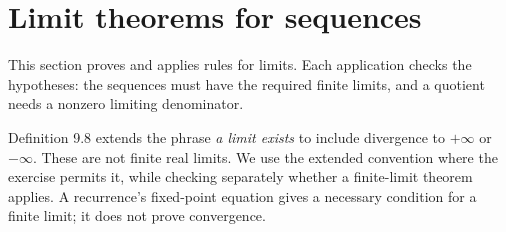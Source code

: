 \section{Limit theorems for sequences}
\label{sec:limit-theorems}
This section proves and applies rules for limits. Each application checks
the hypotheses: the sequences must have the required finite limits,
and a quotient needs a nonzero limiting denominator.

Definition 9.8 extends the phrase \emph{a limit exists} to include divergence
to $+\infty$ or $-\infty$. These are not finite real limits.
We use the extended convention where the exercise permits it, while
checking separately whether a finite-limit theorem applies.
A recurrence's fixed-point equation gives a necessary condition for
a finite limit; it does not prove convergence.



